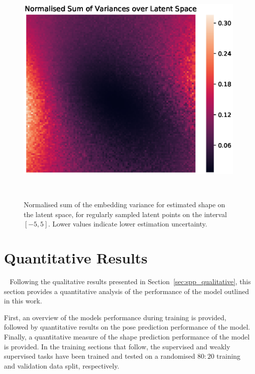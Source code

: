 \begin{figure}[!htbp]
  \centering
  \includegraphics[width=\linewidth]{figures/spp/gp_latent_heatmap.eps}
  \caption[Latent Space Variance]{Normalised sum of the embedding variance for estimated shape on the latent 
  space, for regularly sampled latent points on the interval \( \left[-5, 5\right] \). Lower values indicate 
  lower estimation uncertainty.}
~\label{figure:spp_qualitative_latent_cov}
\end{figure}

\section{Quantitative Results}
~\label{sec:spp_quantitative}
Following the qualitative results presented in Section~\ref{sec:spp_qualitative}, this section 
provides a quantitative analysis of the performance of the model outlined in this work.

First, an overview of the models performance during training is provided, followed by quantitative 
results on the pose prediction performance of the model. Finally, a quantitative measure of the 
shape prediction performance of the model is provided. In the training sections that follow, the supervised 
and weakly supervised tasks have been trained and tested on a randomised \( 80:20 \) training and validation 
data split, respectively.

